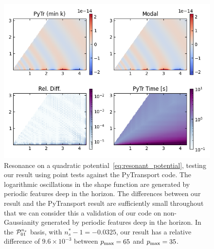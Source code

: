 \begin{figure}[!pth]
\centering
\includegraphics[width=0.99\columnwidth]{plots/slice_min_100.png}
\caption{
    Resonance on a quadratic potential~\eqref{eq:resonant_potential},
    testing our result using point tests against the
    PyTransport code.
    The logarithmic oscillations in the shape function are generated by periodic
    features deep in the horizon.
    The differences between our result and the PyTransport result
    are sufficiently small throughout that we can consider this
    a validation of our code on non-Gaussianity generated by periodic
    features deep in the horizon.
    In the $\mathcal{P}^{n_s}_{01}$ basis, with $n_s^{*}-1 = -0.0325$,
    our result has a relative difference of $9.6\times10^{-3}$
    between $p_\text{max}=65$ and $p_\text{max}=35$.
}\label{pytr_comparison_min}
\end{figure}

